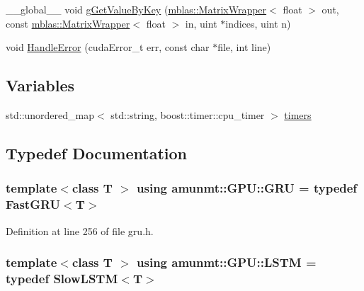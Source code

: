 \begin{DoxyCompactItemize}
\item 
\+\_\+\+\_\+global\+\_\+\+\_\+ void \hyperlink{namespaceamunmt_1_1GPU_a2b768df4c05b3d5f4c1894cbb56c8d05}{g\+Get\+Value\+By\+Key} (\hyperlink{classamunmt_1_1GPU_1_1mblas_1_1MatrixWrapper}{mblas\+::\+Matrix\+Wrapper}$<$ float $>$ out, const \hyperlink{classamunmt_1_1GPU_1_1mblas_1_1MatrixWrapper}{mblas\+::\+Matrix\+Wrapper}$<$ float $>$ in, uint $\ast$indices, uint n)
\item 
void \hyperlink{namespaceamunmt_1_1GPU_aebe531e40abaff95bbd58b556b1a570f}{Handle\+Error} (cuda\+Error\+\_\+t err, const char $\ast$file, int line)
\end{DoxyCompactItemize}
\subsection*{Variables}
\begin{DoxyCompactItemize}
\item 
std\+::unordered\+\_\+map$<$ std\+::string, boost\+::timer\+::cpu\+\_\+timer $>$ \hyperlink{namespaceamunmt_1_1GPU_a308fc6e1bfa76da409cba239406bb7fa}{timers}
\end{DoxyCompactItemize}


\subsection{Typedef Documentation}
\subsubsection[{\texorpdfstring{G\+RU}{GRU}}]{\setlength{\rightskip}{0pt plus 5cm}template$<$class T $>$ using {\bf amunmt\+::\+G\+P\+U\+::\+G\+RU} = typedef {\bf Fast\+G\+RU}$<$T$>$}\hypertarget{namespaceamunmt_1_1GPU_aef4855cf4b6eab614a38b158bda76705}{}\label{namespaceamunmt_1_1GPU_aef4855cf4b6eab614a38b158bda76705}


Definition at line 256 of file gru.\+h.

\subsubsection[{\texorpdfstring{L\+S\+TM}{LSTM}}]{\setlength{\rightskip}{0pt plus 5cm}template$<$class T $>$ using {\bf amunmt\+::\+G\+P\+U\+::\+L\+S\+TM} = typedef {\bf Slow\+L\+S\+TM}$<$T$>$}\hypertarget{namespaceamunmt_1_1GPU_a5da1f5e1c7dfe4068d4a79ae464191d7}{}\label{namespaceamunmt_1_1GPU_a5da1f5e1c7dfe4068d4a79ae464191d7}


